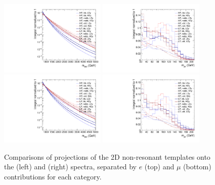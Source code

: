 \begin{figure}[htbp]
  \centering
  \includegraphics[width=0.45\textwidth]{fig/analysis/compTemplate_nonRes_e_MVV_log.pdf}
  \includegraphics[width=0.45\textwidth]{fig/analysis/compTemplate_nonRes_e_MJJ.pdf}\\
  \includegraphics[width=0.45\textwidth]{fig/analysis/compTemplate_nonRes_mu_MVV_log.pdf}
  \includegraphics[width=0.45\textwidth]{fig/analysis/compTemplate_nonRes_mu_MJJ.pdf}\\
  \caption{
    Comparisons of projections of the 2D non-resonant templates onto the \MVV (left) and \MJ (right) spectra, separated by $e$ (top) and $\mu$ (bottom) contributions for each category.
  }
  \label{fig:compTemplate_nonRes}
\end{figure}

